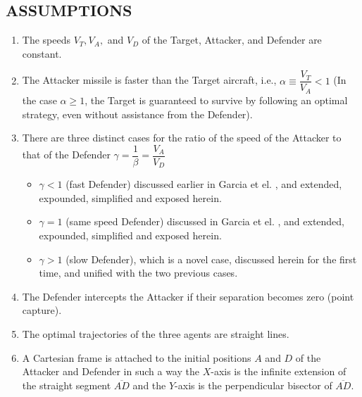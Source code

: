 \documentclass[final,5p,times,twocolumn]{elsarticle}
\begin{document}
\subsection{ASSUMPTIONS}
\begin{enumerate}
\item The speeds $V_{T},V_{A},$ and $V_{D}$ of the Target, Attacker, and Defender are constant.
\item The Attacker missile is faster than the Target aircraft, i.e., $\alpha\equiv \dfrac{V_{T}}{V_{A}}<1$ (In the case $\alpha\geq1$, the Target is guaranteed to survive by following an optimal strategy, even without assistance from the Defender).
\item There are three distinct cases for the ratio of the speed of the Attacker to that of the Defender $\gamma=\dfrac{1}{\beta}=\dfrac{V_{A}}{V_{D}}$ 
\begin{itemize}
\item $\gamma<1$ (fast Defender) discussed earlier in Garcia et el. \cite{garcia2015active}, and extended, expounded, simplified and exposed herein.
\item $\gamma =1$ (same speed Defender) discussed in Garcia et el. \cite{pachter2014active,garcia2015escape}, and extended, expounded, simplified and exposed herein.
\item $\gamma>1$ (slow Defender), which is a novel case, discussed herein for the first time, and unified with the two previous cases.  
\end{itemize}

\item The Defender intercepts the Attacker if their separation becomes zero (point capture).
\item The optimal trajectories of the three agents are straight lines.
\item A Cartesian frame is attached to the initial positions $A$ and $D$ of the Attacker and Defender in such a way the $X$-axis is the infinite extension of the straight segment $\overline{AD}$ and the $Y$-axis is the perpendicular bisector of $\overline{AD}$.
\end{enumerate}
\end{document}
